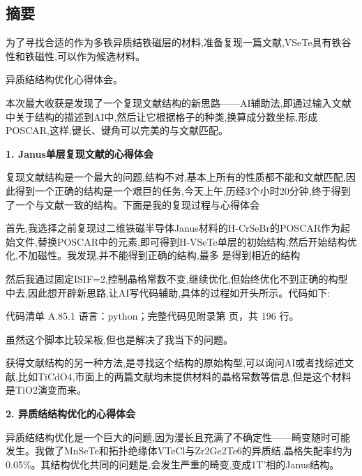 \documentclass[lang=cn,scheme=chinese,color=blue,device=normal,toc=onecol,math=cm]{elegantbook}
\begin{document}
\subsection{摘要}


为了寻找合适的作为多铁异质结铁磁层的材料,准备复现一篇文献,VSeTe具有铁谷性和铁磁性,可以作为候选材料。\par


异质结结构优化心得体会。\par


本次最大收获是发现了一个复现文献结构的新思路——AI辅助法,即通过输入文献中关于结构的描述到AI中,然后让它根据格子的种类,换算成分数坐标,形成POSCAR,这样,键长、键角可以完美的与文献匹配。\par


\textbf{ 1. Janus单层复现文献的心得体会}\par


复现文献结构是一个最大的问题,结构不对,基本上所有的性质都不能和文献匹配,因此得到一个正确的结构是一个艰巨的任务,今天上午,历经3个小时20分钟,终于得到了一个与文献一致的结构。下面是我的复现过程与心得体会\par


首先,我选择之前复现过二维铁磁半导体Janus材料的H-CrSeBr的POSCAR作为起始文件,替换POSCAR中的元素,即可得到H-VSeTe单层的初始结构,然后开始结构优化,不加磁性。我发现,并不能得到正确的结构,最多 是得到相近的结构\par


然后我通过固定ISIF=2,控制晶格常数不变,继续优化,但始终优化不到正确的构型中去,因此想开辟新思路,让AI写代码辅助,具体的过程如开头所示。代码如下:\par


\begin{codeindexbox}{代码清单 A.85.1}
语言：python；完整代码见附录第 \pageref{code:85:1} 页，共 196 行。
\end{codeindexbox}


虽然这个脚本比较呆板,但也是解决了我当下的问题。\par


获得文献结构的另一种方法,是寻找这个结构的原始构型,可以询问AI或者找综述文献,比如TiCdO4,市面上的两篇文献均未提供材料的晶格常数等信息,但是这个材料是TiO2演变而来。\par


\textbf{ 2. 异质结结构优化的心得体会}\par


异质结结构优化是一个巨大的问题,因为漫长且充满了不确定性——畸变随时可能发生。我做了MnSeTe和拓扑绝缘体VTeCl与Zr2Ge2Te6的异质结,晶格失配率约为0.05\%。其结构优化共同的问题是,会发生严重的畸变,变成1T’相的Janus结构。\par
\end{document}

